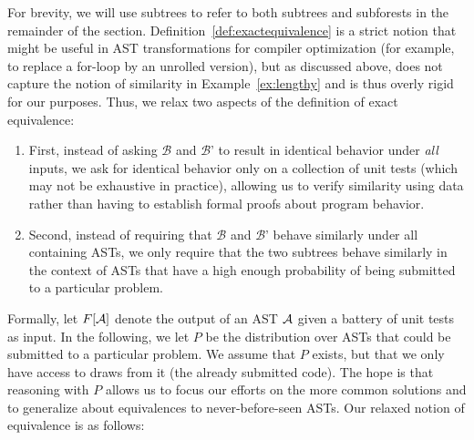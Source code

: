 For brevity, we will use subtrees to refer to both subtrees and subforests in the remainder of the section.
Definition~\ref{def:exactequivalence} is a strict notion that might be useful in AST transformations for compiler optimization 
(for example, to replace a for-loop by an unrolled version), but as discussed above, does not capture the notion of
similarity in Example~\ref{ex:lengthy} and is thus overly rigid for our purposes. Thus, we relax two aspects of the definition of exact equivalence:
\begin{enumerate}
\item First, instead of asking $\mathcal{B}$ and $\mathcal{B}$' to result in identical behavior under \emph{all} inputs, we ask for 
identical behavior only on a collection of unit tests (which may not be exhaustive in practice), allowing us to verify similarity using data 
rather than having to establish formal proofs about program behavior.
\item Second, instead of requiring that $\mathcal{B}$ and $\mathcal{B}$'  behave similarly under all containing ASTs, 
we only require that the two subtrees behave similarly in the context of ASTs that have a high enough probability of being submitted to a particular problem.	
\end{enumerate}
Formally, let $F[\mathcal{A}]$ denote the output of an AST $\mathcal{A}$ given a battery of unit tests as input.
In the following, we let $P$ be the distribution over ASTs that could be submitted to a particular problem.
We assume that $P$ exists, but that we only have access to draws from it (the already submitted code).
The hope is that reasoning with $P$ allows us to focus our efforts on the more common solutions and to generalize 
about equivalences to never-before-seen ASTs.  Our relaxed notion of equivalence is as follows:


%

